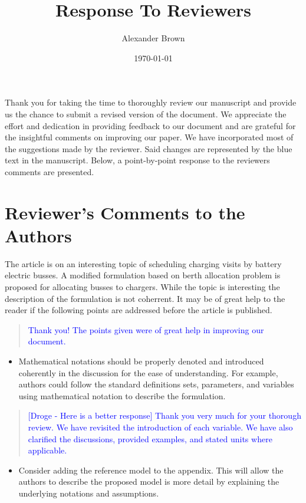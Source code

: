 \documentclass[11pt,a4paper,final]{article}
\author{Alexander Brown}
\date{\today}
\title{Response To Reviewers}
\begin{document}
\maketitle
Thank you for taking the time to thoroughly review our manuscript and provide us the chance to submit a revised version
of the document. We appreciate the effort and dedication in providing feedback to our document and are grateful for the
insightful comments on improving our paper. We have incorporated most of the suggestions made by the reviewer. Said
changes are represented by the blue text in the manuscript. Below, a point-by-point response to the reviewers comments
are presented.

\section{Reviewer's Comments to the Authors}
\label{sec:org10c8947}

The article is on an interesting topic of scheduling charging visits by battery electric busses. A modified formulation
based on berth allocation problem is proposed for allocating busses to chargers. While the topic is interesting the
description of the formulation is not coherrent. It may be of great help to the reader if the following points are
addressed before the article is published.

\begin{quote}
  \textcolor{blue}{Thank you! The points given were of great help in improving our document.}
\end{quote}

\begin{itemize}
\item Mathematical notations should be properly denoted and introduced coherently in the discussion for the ease of understanding. For example, authors could follow the standard definitions sets, parameters, and variables using mathematical notation to describe the formulation.
\end{itemize}

\begin{quote}
  \textcolor{blue}{[Droge - Here is a better response] Thank you very much for your thorough review. We have revisited the introduction of each variable. We have also clarified the discussions, provided examples, and stated units where applicable.}
\end{quote}

\begin{itemize}
\item Consider adding the reference model to the appendix. This will allow the authors to describe the proposed model is more detail by explaining the underlying notations and assumptions.
\end{itemize}
\end{document}

